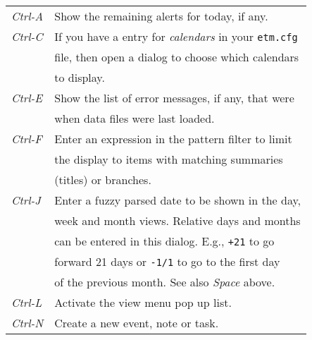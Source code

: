 \documentclass[9pt,landscape]{article}
\begin{document}
\begin{multicols}{3}
\begin{tabular}{@{}ll@{}}
\emph{Ctrl-A}        & Show the remaining alerts for today, if any. \\
\emph{Ctrl-C}        & If you have a entry for \emph{calendars} in your \verb!etm.cfg! \\
                        & file, then open a dialog to choose which calendars \\
                        & to display. \\
\emph{Ctrl-E}        & Show the list of error messages, if any, that were \\
                        & when data files were last loaded.  \\
\emph{Ctrl-F}        & Enter an expression in the pattern filter to limit \\
                        & the display to items with matching summaries  \\
                        & (titles) or branches. \\
\emph{Ctrl-J}        & Enter a fuzzy parsed date to be shown in the day, \\
                        & week and month views. Relative days and months \\
                        & can be entered in this dialog. E.g., \verb'+21' to go \\
                        & forward 21 days or \verb'-1/1' to go to the first day \\
                        & of the previous month. See also \emph{Space} above. \\
\emph{Ctrl-L}        & Activate the view menu pop up list. \\
\emph{Ctrl-N}        & Create a new event, note or task. \\
\end{tabular}
\begin{tabular}{@{}ll@{}}


\end{tabular}
\end{multicols}
\end{document}
